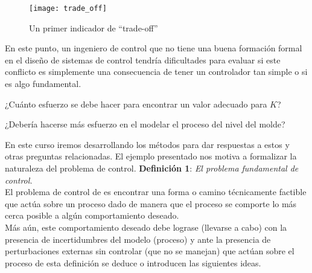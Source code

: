 \documentclass[a4paper]{article}
\begin{document}
\begin{figure}[!h]
\centering
\texttt{[image: trade\_off]}
\caption{Un primer indicador de ``trade-off''}
\label{trade}
\end{figure}

En este punto, un ingeniero de control  que no tiene una buena formación formal en el diseño de sistemas de control tendría dificultades para evaluar si este conflicto es simplemente una consecuencia  de tener un controlador tan simple o si es algo fundamental.

¿Cuánto esfuerzo se debe hacer para encontrar un valor adecuado para $K$?

¿Debería hacerse más esfuerzo en el modelar el proceso del nivel del molde?

En este curso iremos desarrollando los métodos para dar respuestas a estos y otras preguntas relacionadas. El ejemplo presentado nos motiva a formalizar la naturaleza del problema de control.
\newpage
\vspace{1mm}
\textbf{Definición 1}: \textit{El problema fundamental de control.}
\vspace{1mm}
\\
El problema de control de es encontrar una forma o camino técnicamente factible que actúa sobre un proceso dado de manera que el proceso se comporte lo más cerca posible a algún comportamiento deseado.\\
Más aún, este comportamiento deseado debe lograse (llevarse a cabo) con la presencia de incertidumbres del modelo (proceso) y ante la presencia de perturbaciones externas sin controlar (que no se manejan) que actúan sobre el proceso de esta definición se deduce o introducen las siguientes ideas.\\
\end{document}

